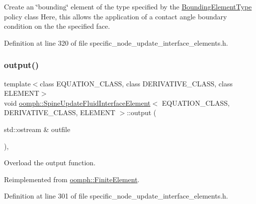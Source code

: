 Create an \char`\"{}bounding\char`\"{} element of the type specified by the \hyperlink{classoomph_1_1BoundingElementType}{Bounding\+Element\+Type} policy class Here, this allows the application of a contact angle boundary condition on the the specified face. 



Definition at line 320 of file specific\+\_\+node\+\_\+update\+\_\+interface\+\_\+elements.\+h.

\mbox{\label{classoomph_1_1SpineUpdateFluidInterfaceElement_ae2875e70d1f8eacc229ea3d4318f7de4}} 
\subsubsection{\texorpdfstring{output()}{output()}\hspace{0.1cm}{\footnotesize\ttfamily [1/4]}}
{\footnotesize\ttfamily template$<$class E\+Q\+U\+A\+T\+I\+O\+N\+\_\+\+C\+L\+A\+SS, class D\+E\+R\+I\+V\+A\+T\+I\+V\+E\+\_\+\+C\+L\+A\+SS, class E\+L\+E\+M\+E\+NT$>$ \\
void \hyperlink{classoomph_1_1SpineUpdateFluidInterfaceElement}{oomph\+::\+Spine\+Update\+Fluid\+Interface\+Element}$<$ E\+Q\+U\+A\+T\+I\+O\+N\+\_\+\+C\+L\+A\+SS, D\+E\+R\+I\+V\+A\+T\+I\+V\+E\+\_\+\+C\+L\+A\+SS, E\+L\+E\+M\+E\+NT $>$\+::output (\begin{DoxyParamCaption}\item[{std\+::ostream \&}]{outfile }\end{DoxyParamCaption})\hspace{0.3cm}{\ttfamily [inline]}, {\ttfamily [virtual]}}



Overload the output function. 



Reimplemented from \hyperlink{classoomph_1_1FiniteElement_a2ad98a3d2ef4999f1bef62c0ff13f2a7}{oomph\+::\+Finite\+Element}.



Definition at line 301 of file specific\+\_\+node\+\_\+update\+\_\+interface\+\_\+elements.\+h.

\mbox{\label{classoomph_1_1SpineUpdateFluidInterfaceElement_a3c9c00def11f68f48db0f46004f1e6fe}} 
